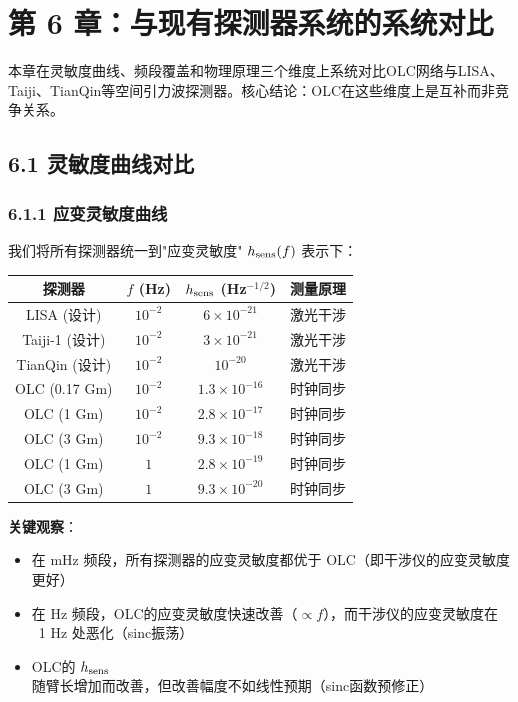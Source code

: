 \documentclass[12pt,a4paper]{article}
\begin{document}
\section{第 6 章：与现有探测器系统的系统对比}


本章在灵敏度曲线、频段覆盖和物理原理三个维度上系统对比OLC网络与LISA、Taiji、TianQin等空间引力波探测器。核心结论：OLC在这些维度上是互补而非竞争关系。

\subsection{6.1 灵敏度曲线对比}


\subsubsection{6.1.1 应变灵敏度曲线}


我们将所有探测器统一到"应变灵敏度" $h_{\rm sens}(f)$ 表示下：

\begin{tabular}{|c|c|c|c|}
\hline
探测器 & $f$ (Hz) & $h_{\rm sens}$ (Hz$^{-1/2}$) & 测量原理 \\
\hline
LISA (设计) & $10^{-2}$ & $6 \times 10^{-21}$ & 激光干涉 \\
Taiji-1 (设计) & $10^{-2}$ & $3 \times 10^{-21}$ & 激光干涉 \\
TianQin (设计) & $10^{-2}$ & $10^{-20}$ & 激光干涉 \\
OLC (0.17 Gm) & $10^{-2}$ & $1.3 \times 10^{-16}$ & 时钟同步 \\
OLC (1 Gm) & $10^{-2}$ & $2.8 \times 10^{-17}$ & 时钟同步 \\
OLC (3 Gm) & $10^{-2}$ & $9.3 \times 10^{-18}$ & 时钟同步 \\
OLC (1 Gm) & $1$ & $2.8 \times 10^{-19}$ & 时钟同步 \\
OLC (3 Gm) & $1$ & $9.3 \times 10^{-20}$ & 时钟同步 \\
\hline
\end{tabular}


\textbf{关键观察}：
\begin{itemize}
  \item[1] 在 mHz 频段，所有探测器的应变灵敏度都优于 OLC（即干涉仪的应变灵敏度更好）
  \item[2] 在 Hz 频段，OLC的应变灵敏度快速改善（$\propto f$），而干涉仪的应变灵敏度在 ~1 Hz 处恶化（sinc振荡）
  \item[3] OLC的 $h_{\rm sens}$ 随臂长增加而改善，但改善幅度不如线性预期（sinc函数预修正）

\end{itemize}
\end{document}
